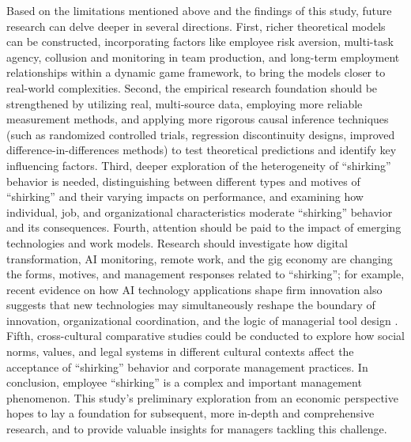 Based on the limitations mentioned above and the findings of this study, future research can delve deeper in several directions. First, richer theoretical models can be constructed, incorporating factors like employee risk aversion, multi-task agency, collusion and monitoring in team production, and long-term employment relationships within a dynamic game framework, to bring the models closer to real-world complexities. Second, the empirical research foundation should be strengthened by utilizing real, multi-source data, employing more reliable measurement methods, and applying more rigorous causal inference techniques (such as randomized controlled trials, regression discontinuity designs, improved difference-in-differences methods) to test theoretical predictions and identify key influencing factors. Third, deeper exploration of the heterogeneity of \enquote{shirking} behavior is needed, distinguishing between different types and motives of \enquote{shirking} and their varying impacts on performance, and examining how individual, job, and organizational characteristics moderate \enquote{shirking} behavior and its consequences. Fourth, attention should be paid to the impact of emerging technologies and work models. Research should investigate how digital transformation, AI monitoring, remote work, and the gig economy are changing the forms, motives, and management responses related to \enquote{shirking}; for example, recent evidence on how AI technology applications shape firm innovation also suggests that new technologies may simultaneously reshape the boundary of innovation, organizational coordination, and the logic of managerial tool design \citep{LiYuHuaRenGongZhiNengJiShuYingYongRuHeYingXiangQiYeChuangXin2024}. Fifth, cross-cultural comparative studies could be conducted to explore how social norms, values, and legal systems in different cultural contexts affect the acceptance of \enquote{shirking} behavior and corporate management practices. In conclusion, employee \enquote{shirking} is a complex and important management phenomenon. This study's preliminary exploration from an economic perspective hopes to lay a foundation for subsequent, more in-depth and comprehensive research, and to provide valuable insights for managers tackling this challenge.
